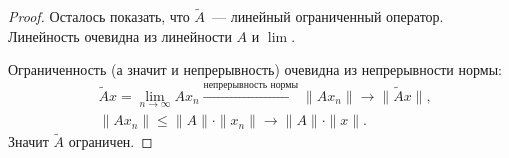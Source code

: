 \begin{proof}
    Осталось показать, что $\widetilde{A}$~--- линейный ограниченный оператор. Линейность очевидна из линейности $A$ и $\lim$.

    Ограниченность (а значит и непрерывность) очевидна из непрерывности нормы:
    \begin{align*}
        &\widetilde{A}x = \lim\limits_{n \to \infty} Ax_n \xrightarrow{\text{непрерывность нормы}} \|Ax_n\| \to \|\widetilde{A}x\|,\\
        &\|Ax_n\| \leqslant \|A\|\cdot\|x_n\| \to \|A\|\cdot\|x\|.
    \end{align*}
    Значит $\widetilde{A}$ ограничен.
\end{proof}